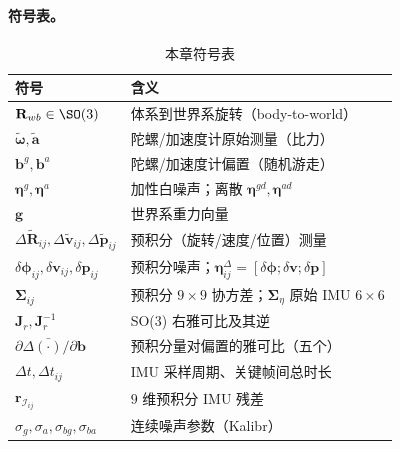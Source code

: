 \paragraph{符号表。}
\begin{table}[H]\centering\small
\caption{本章符号表}
\begin{tabular}{ll}
\toprule
符号 & 含义 \\
\midrule
$\mathbf R_{wb}\in\SO(3)$ & 体系到世界系旋转（body-to-world） \\
$\tilde{\boldsymbol\omega},\tilde{\mathbf a}$ & 陀螺/加速度计原始测量（比力） \\
$\mathbf b^g,\mathbf b^a$ & 陀螺/加速度计偏置（随机游走） \\
$\boldsymbol\eta^g,\boldsymbol\eta^a$ & 加性白噪声；离散 $\boldsymbol\eta^{gd},\boldsymbol\eta^{ad}$ \\
$\mathbf g$ & 世界系重力向量 \\
$\Delta\tilde{\mathbf R}_{ij},\Delta\tilde{\mathbf v}_{ij},\Delta\tilde{\mathbf p}_{ij}$ & 预积分（旋转/速度/位置）测量 \\
$\delta\boldsymbol\phi_{ij},\delta\mathbf v_{ij},\delta\mathbf p_{ij}$ & 预积分噪声；$\boldsymbol\eta_{ij}^\Delta=[\delta\boldsymbol\phi;\delta\mathbf v;\delta\mathbf p]$ \\
$\boldsymbol\Sigma_{ij}$ & 预积分 $9\times9$ 协方差；$\boldsymbol\Sigma_\eta$ 原始 IMU $6\times6$ \\
$\mathbf J_r,\mathbf J_r^{-1}$ & SO(3) 右雅可比及其逆 \\
$\partial\Delta\bar{(\cdot)}/\partial\mathbf b$ & 预积分量对偏置的雅可比（五个） \\
$\Delta t,\Delta t_{ij}$ & IMU 采样周期、关键帧间总时长 \\
$\mathbf r_{\mathcal I_{ij}}$ & $9$ 维预积分 IMU 残差 \\
$\sigma_g,\sigma_a,\sigma_{bg},\sigma_{ba}$ & 连续噪声参数（Kalibr） \\
\bottomrule
\end{tabular}
\end{table}

